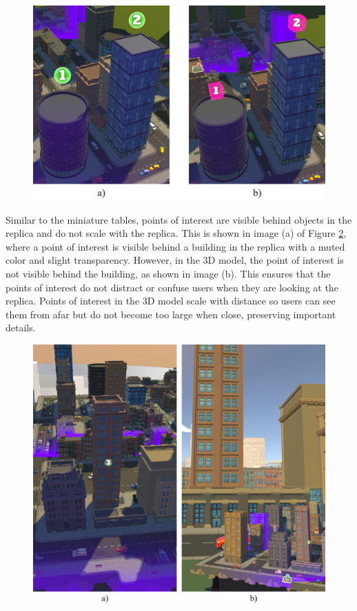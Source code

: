         \begin{figure}[h!]
            \centering
            \includegraphics[width=.8\textwidth]{figures/poi_appearance.png}
            \label{fig:poi_appearance}
        \end{figure}

        Similar to the miniature tables, points of interest are visible behind objects in the replica and do not scale with the replica. This is shown in image (a) of Figure \ref{fig:poi_visibility}, where a point of interest is visible behind a building in the replica with a muted color and slight transparency. However, in the 3D model, the point of interest is not visible behind the building, as shown in image (b). This ensures that the points of interest do not distract or confuse users when they are looking at the replica. Points of interest in the 3D model scale with distance so users can see them from afar but do not become too large when close, preserving important details.

       \begin{figure}[h!]
            \centering
            \includegraphics[width=.8\textwidth]{figures/poi_visibility.png}
            \label{fig:poi_visibility}
        \end{figure}


